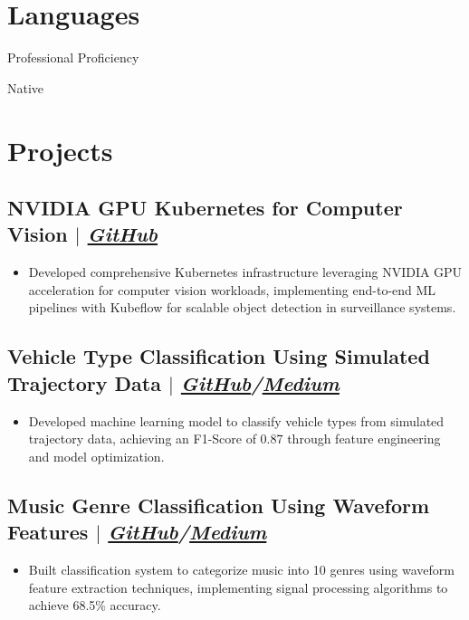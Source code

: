 \documentclass[11pt]{article} %
\begin{document}
\section{Languages}
\begin{description}[itemsep=0pt]
	\item[English] Professional Proficiency
	\item[Portuguese] Native
\end{description}

\section{Projects}
\subsection{NVIDIA GPU Kubernetes for Computer Vision $|$ \normalfont\textit{\href{https://github.com/Pedrohgv/nvidia-gpu-kubernetes}{GitHub}}}
\begin{itemize}
  \item Developed comprehensive Kubernetes infrastructure leveraging NVIDIA GPU acceleration for computer vision workloads, implementing end-to-end ML pipelines with Kubeflow for scalable object detection in surveillance systems.
\end{itemize}

\subsection{Vehicle Type Classification Using Simulated Trajectory Data $|$ \normalfont\textit{\href{https://github.com/Pedrohgv/standard-traffic-data/blob/main/knowledge/Vehicle_Type_Prediction.ipynb}{GitHub}/\href{https://towardsdatascience.com/vehicle-type-prediction-using-simulated-trajectory-data-59a522e30003/}{Medium}}}
\begin{itemize}
  \item Developed machine learning model to classify vehicle types from simulated trajectory data, achieving an F1-Score of 0.87 through feature engineering and model optimization.
\end{itemize}

\subsection{Music Genre Classification Using Waveform Features $|$ \normalfont\textit{\href{https://github.com/Pedrohgv/Music_Genre_Classification/blob/master/notebook.ipynb}{GitHub}/\href{https://towardsdatascience.com/predicting-music-genres-using-waveform-features-5080e788eb64/}{Medium}}}
\begin{itemize}
  \item Built classification system to categorize music into 10 genres using waveform feature extraction techniques, implementing signal processing algorithms to achieve 68.5\% accuracy.
\end{itemize}
\end{document}
